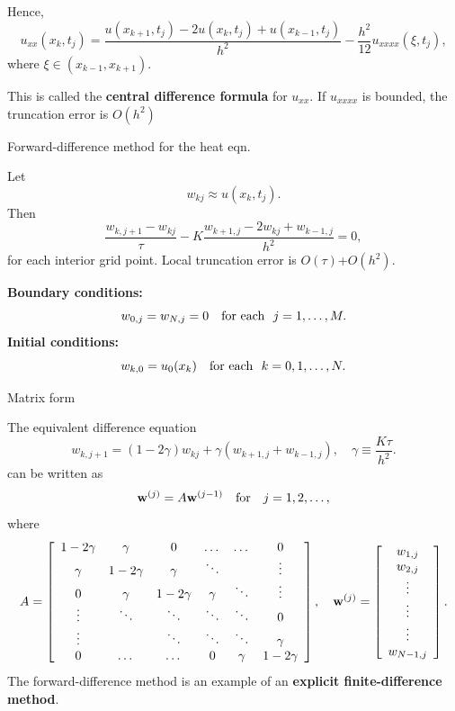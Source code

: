 \documentclass{beamer}
\begin{document}


\begin{frame}{}
Hence,
\[
u_{xx}(x_k,t_j)=\frac{u(x_{k+1},t_j)-2u(x_k,t_j)+u(x_{k-1},t_j)}{h^2}
-\frac{h^2}{12}u_{xxxx}(\xi,t_{j}),
\]
where $\xi\in(x_{k-1},x_{k+1})$.

This is called the {\bf central difference formula} for $u_{xx}$.
If $u_{xxxx}$ is bounded, the truncation error is $O(h^2)$


\end{frame}



\begin{frame}{Forward-difference method for the heat eqn.}

Let
\[
w_{kj}\approx u(x_{k},t_{j}).
\]
Then
\[
\frac{w_{k,j+1}-w_{kj}}{\tau}-K
\frac{w_{k+1, j}-2w_{kj}+w_{k-1,j}}{h^{2}}=0,
\]
for each interior grid point. Local truncation error is $O(\tau)$+$O(h^2)$.

{\bf Boundary conditions:}
\[
w_{0,j}=w_{N,j}=0  \quad
{\rm for \ each} \ \ j=1, \dots, M.
\]
{\bf Initial conditions:}
\[
w_{k,0}=u_{0}(x_{k})  \quad
{\rm for \ each} \ \ k=0, 1, \dots, N.
\]


\end{frame}



\begin{frame}{\small Matrix form}

{\small
The equivalent difference equation
\[
w_{k,j+1}=\left(1-2\gamma\right)w_{kj}+
\gamma\left(
w_{k+1, j}+w_{k-1,j}\right), \quad \gamma\equiv \frac{K\tau}{h^{2}}.
\]
can be written as
\[
{\bf w}^{(j)}=A{\bf w}^{(j-1)} \quad \hbox{for} \quad j=1,2,\dots,
\]
where
\[
A=\left[
\begin{array}{cccccc}
1-2\gamma &\gamma &0      &\dots  &\dots &0 \\
\gamma &1-2\gamma &\gamma &\ddots  &     &\vdots \\
0      &\gamma &1-2\gamma &\gamma &\ddots &\vdots \\
\vdots &\ddots &\ddots &\ddots &\ddots &0 \\
\vdots &       &\ddots &\ddots &\ddots &\gamma \\
0      &\dots  &\dots  &0      &\gamma &1-2\gamma
\end{array}\right], \quad
{\bf w}^{(j)}=\left[
\begin{array}{c}
w_{1,j} \\
w_{2,j} \\
\vdots \\
\vdots \\
\vdots \\
w_{N-1,j}
\end{array}\right].
\label{b7}
\]
The forward-difference method is an example of an {\bf explicit finite-difference method}.
}

\end{frame}
\end{document}
